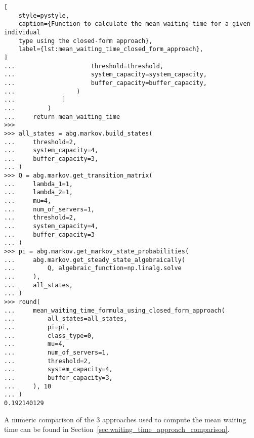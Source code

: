 \begin{lstlisting}[
    style=pystyle,
    caption={Function to calculate the mean waiting time for a given individual
    type using the closed-form approach},
    label={lst:mean_waiting_time_closed_form_approach},
]
...                     threshold=threshold,
...                     system_capacity=system_capacity,
...                     buffer_capacity=buffer_capacity,
...                 )
...             ]
...         )
...     return mean_waiting_time
>>>
>>> all_states = abg.markov.build_states(
...     threshold=2,
...     system_capacity=4,
...     buffer_capacity=3,
... )
>>> Q = abg.markov.get_transition_matrix(
...     lambda_1=1,
...     lambda_2=1,
...     mu=4,
...     num_of_servers=1,
...     threshold=2,
...     system_capacity=4,
...     buffer_capacity=3
... )
>>> pi = abg.markov.get_markov_state_probabilities(
...     abg.markov.get_steady_state_algebraically(
...         Q, algebraic_function=np.linalg.solve
...     ),
...     all_states,
... )
>>> round(
...     mean_waiting_time_formula_using_closed_form_approach(
...         all_states=all_states,
...         pi=pi,
...         class_type=0,
...         mu=4,
...         num_of_servers=1,
...         threshold=2,
...         system_capacity=4,
...         buffer_capacity=3,
...     ), 10
... )
0.192140129

\end{lstlisting}

A numeric comparison of the 3 approaches used to compute the mean waiting time
can be found in Section~\ref{sec:waiting_time_approach_comparison}.

